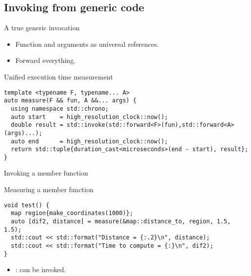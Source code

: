 \subsection{Invoking from generic code}

\begin{frame}[t,fragile]{A true generic invocation}
\begin{itemize}
  \item Function and arguments as universal references.
  \item Forward everything.
\end{itemize}

\begin{block}{Unified execution time measurement}
\begin{lstlisting}
template <typename F, typename... A>
auto measure(F && fun, A &&... args) {
  using namespace std::chrono;
  auto start    = high_resolution_clock::now();
  double result = std::invoke(std::forward<F>(fun),std::forward<A>(args)...);
  auto end      = high_resolution_clock::now();
  return std::tuple{duration_cast<microseconds>(end - start), result};
}
\end{lstlisting}
\end{block}
\end{frame}

\begin{frame}[t,fragile]{Invoking a member function}
\begin{block}{Measuring a member function}
\begin{lstlisting}
void test() {
  map region{make_coordinates(1000)};           
  auto [dif2, distance] = measure(&map::distance_to, region, 1.5, 1.5); 
  std::cout << std::format("Distance = {:.2}\n", distance);
  std::cout << std::format("Time to compute = {:}\n", dif2);
}
\end{lstlisting}
\end{block}

\begin{itemize}
  \item {}:  can be invoked.
\end{itemize}
\end{frame}
